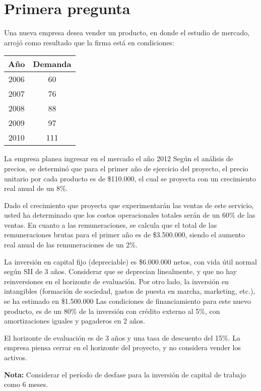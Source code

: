 \section{Primera pregunta}

Una nueva empresa desea vender un producto, en donde el estudio de mercado,
arrojó como resultado que la firma está en condiciones:

\begin{center}
    \begin{tabular}{|c|c|}
        \hline
        Año   &  Demanda\\\hline
        2006  &  60\\
        2007  &  76\\
        2008  &  88\\
        2009  &  97\\
        2010  &  111\\\hline
    \end{tabular}
\end{center}

La empresa planea ingresar en el mercado el año 2012 Según el análisis de precios,
se determinó que para el primer año de ejercicio del proyecto, el precio unitario
por cada producto es de \$110.000, el cual se proyecta con un crecimiento real anual de un 8\%.

Dado el crecimiento que proyecta que experimentarán las ventas de este servicio,
usted ha determinado que los costos operacionales totales serán de un 60\% de las ventas.
En cuanto a las remuneraciones, se calcula que el total de las remuneraciones brutas para
el primer año es de \$3.500.000, siendo el aumento real anual de las remuneraciones de un 2\%. 

La inversión en capital fijo (depreciable) es \$6.000.000 netos, con vida útil normal según SII de 3 años.
Considerar que se deprecian linealmente, y que no hay reinversiones en el horizonte de evaluación.
Por otro lado, la inversión en intangibles (formación de sociedad, gastos de puesta en marcha, marketing, etc.),
se ha estimado en \$1.500.000 
Las condiciones de financiamiento para este nuevo producto,
es de un 80\% de la inversión con crédito externo al 5\%, con amortizaciones iguales y pagaderos en 2 años. 

El horizonte de evaluación es de 3 años y una tasa de descuento del 15\%.
La empresa piensa cerrar en el horizonte del proyecto, y no considera vender los activos.

\textbf{Nota:} Considerar el período de desfase para la inversión de capital de trabajo como 6 meses.

